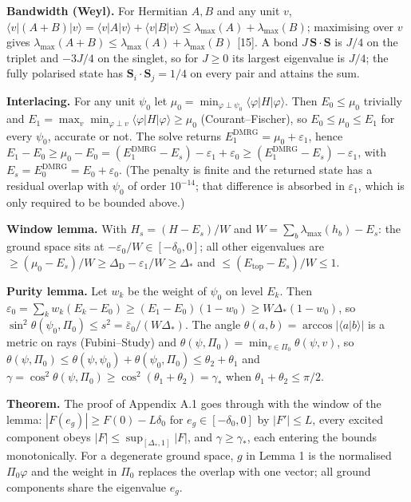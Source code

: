 \documentclass[
]{article}
\begin{document}
\textbf{Bandwidth (Weyl).} For Hermitian \(A,B\) and any unit \(v\),
\(\langle v|(A+B)|v\rangle=\langle v|A|v\rangle+\langle v|B|v\rangle\le\lambda_{\max}(A)+\lambda_{\max}(B)\);
maximising over \(v\) gives
\(\lambda_{\max}(A+B)\le\lambda_{\max}(A)+\lambda_{\max}(B)\) {[}15{]}.
A bond \(J\,\mathbf S\!\cdot\!\mathbf S\) is \(J/4\) on the triplet and
\(-3J/4\) on the singlet, so for \(J\ge0\) its largest eigenvalue is
\(J/4\); the fully polarised state has
\(\mathbf S_i\!\cdot\!\mathbf S_j=1/4\) on every pair and attains the
sum.

\textbf{Interlacing.} For any unit \(\psi_0\) let
\(\mu_0=\min_{\varphi\perp\psi_0}\langle\varphi|H|\varphi\rangle\). Then
\(E_0\le\mu_0\) trivially and
\(E_1=\max_v\min_{\varphi\perp v}\langle\varphi|H|\varphi\rangle\ge\mu_0\)
(Courant--Fischer), so \(E_0\le\mu_0\le E_1\) for every \(\psi_0\),
accurate or not. The solve returns
\(E_1^{\mathrm{DMRG}}=\mu_0+\varepsilon_1\), hence
\(E_1-E_0\ge\mu_0-E_0=(E_1^{\mathrm{DMRG}}-E_s)-\varepsilon_1+\varepsilon_0\ge(E_1^{\mathrm{DMRG}}-E_s)-\varepsilon_1\),
with \(E_s=E_0^{\mathrm{DMRG}}=E_0+\varepsilon_0\). (The penalty is
finite and the returned state has a residual overlap with \(\psi_0\) of
order \(10^{-14}\); that difference is absorbed in \(\varepsilon_1\),
which is only required to be bounded above.)

\textbf{Window lemma.} With \(H_s=(H-E_s)/W\) and
\(W=\sum_b\lambda_{\max}(h_b)-E_s\): the ground space sits at
\(-\varepsilon_0/W\in[-\delta_0,0]\); all other eigenvalues are
\(\ge(\mu_0-E_s)/W\ge\Delta_{\mathrm{D}}-\varepsilon_1/W\ge\Delta_*\)
and \(\le(E_{\mathrm{top}}-E_s)/W\le1\).

\textbf{Purity lemma.} Let \(w_k\) be the weight of \(\psi_0\) on level
\(E_k\). Then
\(\varepsilon_0=\sum_kw_k(E_k-E_0)\ge(E_1-E_0)(1-w_0)\ge W\Delta_*(1-w_0)\),
so \(\sin^2\theta(\psi_0,\Pi_0)\le s^2=\bar\varepsilon_0/(W\Delta_*)\).
The angle \(\theta(a,b)=\arccos|\langle a|b\rangle|\) is a metric on
rays (Fubini--Study) and
\(\theta(\psi,\Pi_0)=\min_{v\in\Pi_0}\theta(\psi,v)\), so
\(\theta(\psi,\Pi_0)\le\theta(\psi,\psi_0)+\theta(\psi_0,\Pi_0)\le\theta_2+\theta_1\)
and
\(\gamma=\cos^2\theta(\psi,\Pi_0)\ge\cos^2(\theta_1+\theta_2)=\gamma_*\)
when \(\theta_1+\theta_2\le\pi/2\).

\textbf{Theorem.} The proof of Appendix A.1 goes through with the window
of the lemma: \(|F(e_g)|\ge F(0)-L\delta_0\) for \(e_g\in[-\delta_0,0]\)
by \(|F'|\le L\), every excited component obeys
\(|F|\le\sup_{[\Delta_*,1]}|F|\), and \(\gamma\ge\gamma_*\), each
entering the bounds monotonically. For a degenerate ground space, \(g\)
in Lemma 1 is the normalised \(\Pi_0\varphi\) and the weight in
\(\Pi_0\) replaces the overlap with one vector; all ground components
share the eigenvalue \(e_g\).
\end{document}

